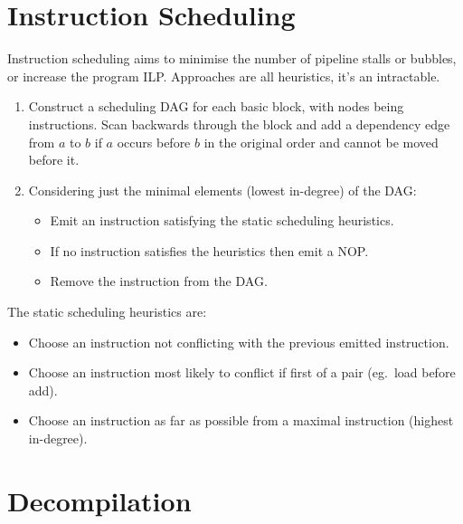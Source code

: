 \documentclass[a4paper, 11pt]{article}
\begin{document}
\section*{Instruction Scheduling}
{
    Instruction scheduling aims to minimise the number of pipeline stalls or bubbles, or increase the program ILP. Approaches are all heuristics, it's an intractable.

    \begin{enumerate}
    \item Construct a scheduling DAG for each basic block, with nodes being instructions. Scan backwards through the block and add a dependency edge from \(a\) to \(b\) if \(a\) occurs before \(b\) in the original order and cannot be moved before it.
    \item
    {
        Considering just the minimal elements (lowest in-degree) of the DAG:
        \begin{itemize}
        \item Emit an instruction satisfying the static scheduling heuristics.
        \item If no instruction satisfies the heuristics then emit a NOP.
        \item Remove the instruction from the DAG.
        \end{itemize}
    }
    \end{enumerate}

    The static scheduling heuristics are:
    \begin{itemize}
    \item Choose an instruction not conflicting with the previous emitted instruction.
    \item Choose an instruction most likely to conflict if first of a pair (eg.\ load before add).
    \item Choose an instruction as far as possible from a maximal instruction (highest in-degree).
    \end{itemize}
}
\section*{Decompilation}
{
}
\end{document}
